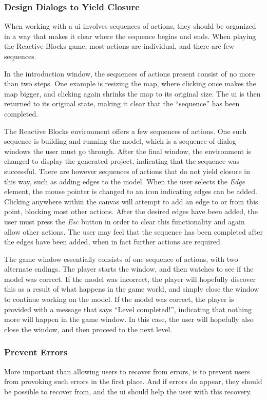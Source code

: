 \subsubsection{Design Dialogs to Yield Closure}
When working with a \gls{ui} involves sequences of actions, they should be organized in a way that makes it clear where the sequence begins and ends. When playing the Reactive Blocks game, most actions are individual, and there are few sequences.

\noindent
In the introduction window, the sequences of actions present consist of no more than two steps. One example is resizing the map, where clicking once makes the map bigger, and clicking again shrinks the map to its original size. The \gls{ui} is then returned to its original state, making it clear that the ``sequence'' has been completed.

\noindent
The Reactive Blocks environment offers a few sequences of actions. One such sequence is building and running the model, which is a sequence of dialog windows the user must go through. After the final window, the environment is changed to display the generated project, indicating that the sequence was successful. There are however sequences of actions that do not yield closure in this way, such as adding edges to the model. When the user selects the \emph{Edge} element, the mouse pointer is changed to an icon indicating edges can be added. Clicking anywhere within the canvas will attempt to add an edge to or from this point, blocking most other actions. After the desired edges have been added, the user must press the \emph{Esc} button in order to clear this functionality and again allow other actions. The user may feel that the sequence has been completed after the edges have been added, when in fact further actions are required.

\noindent
The game window essentially consists of one sequence of actions, with two alternate endings. The player starts the window, and then watches to see if the model was correct. If the model was incorrect, the player will hopefully discover this as a result of what happens in the game world, and simply close the window to continue working on the model. If the model was correct, the player is provided with a message that says ``Level completed!'', indicating that nothing more will happen in the game window. In this case, the user will hopefully also close the window, and then proceed to the next level.

\subsubsection{Prevent Errors}
More important than allowing users to recover from errors, is to prevent users from provoking such errors in the first place. And if errors do appear, they should be possible to recover from, and the \gls{ui} should help the user with this recovery.

